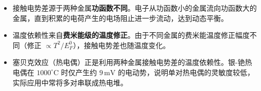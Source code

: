 \begin{insightbox}[物理图像]
\begin{itemize}
    \item 接触电势差源于两种金属\textbf{功函数不同}。电子从功函数小的金属流向功函数大的金属，直到积累的电荷产生的电场阻止进一步流动，达到动态平衡。
    \item 温度依赖性来自\textbf{费米能级的温度修正}。由于不同金属的费米能温度修正幅度不同（修正 $\propto T^2/E_F^0$），接触电势差也随温度变化。
    \item 塞贝克效应（热电偶）正是利用两种金属接触电势差的温度依赖性。银-铯热电偶在 $1000^\circ\text{C}$ 时仅产生约 $9\,\text{mV}$ 的电动势，说明单对热电偶的灵敏度较低，实际应用中常将多对串联成热电堆。
\end{itemize}
\end{insightbox}
